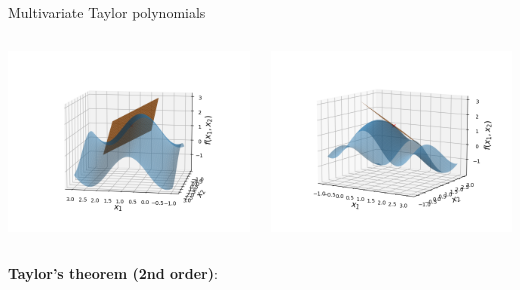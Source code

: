 \documentclass[11pt,compress,t,notes=noshow, xcolor=table]{beamer}
\begin{document}
\begin{vbframe}{Multivariate Taylor polynomials}
\begin{columns}
  \begin{column}{0.4\textwidth}
    \includegraphics[width = \textwidth]{figure_man/Taylor2D/Taylor2D_1st100.png}
  \end{column}
  \begin{column}{0.4\textwidth}
    \includegraphics[width = \textwidth]{figure_man/Taylor2D/Taylor2D_1st301.png}
  \end{column}
\end{columns}

\framebreak 

\textbf{Taylor's theorem (2nd order)}: 


\end{vbframe}
\end{document}
